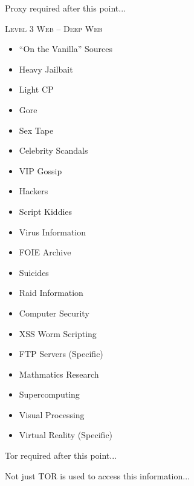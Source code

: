 \documentclass[11pt,twoside,a4paper]{book}
\begin{document}
\begin{LARGE} \begin{center} Proxy required after this point... \end{center} \end{LARGE}

\noindent
\textsc{Level 3 Web -- Deep Web}

\begin{minipage}[t]{0.45\linewidth}
	\begin{itemize}
		\setlength{\itemsep}{1pt}
		\setlength{\parskip}{0pt}
		\setlength{\parsep}{0pt}
		
		\item ``On the Vanilla'' Sources
		\item Heavy Jailbait
		\item Light CP
		\item Gore
		\item Sex Tape
		\item Celebrity Scandals
		\item VIP Gossip
		\item Hackers
		\item Script Kiddies
		\item Virus Information
	\end{itemize}
\end{minipage}
\hfill
\begin{minipage}[t]{0.45\linewidth}
	\begin{itemize}
		\setlength{\itemsep}{1pt}
		\setlength{\parskip}{0pt}
		\setlength{\parsep}{0pt}
		
		\item FOIE Archive
		\item Suicides
		\item Raid Information
		\item Computer Security
		\item XSS Worm Scripting
		\item FTP Servers (Specific)
		\item Mathmatics Research
		\item Supercomputing
		\item Visual Processing
		\item Virtual Reality (Specific)
	\end{itemize}
\end{minipage}

\begin{LARGE} \begin{center} Tor required after this point... \end{center} \end{LARGE}
\begin{small} \begin{center} Not just TOR is used to access this information... \end{center} \end{small}
\end{document}
